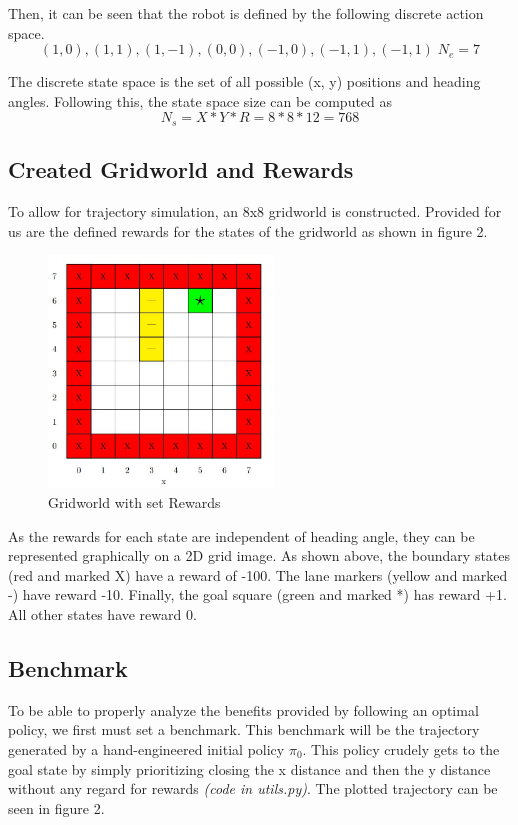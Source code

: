 \documentclass[fullpage]{article}
\begin{document}
Then, it can be seen that the robot is defined by the following discrete action space.
\[
(1, 0), (1, 1), (1,-1), (0,0), (-1,0), (-1,1), (-1,1) \; N_e = 7
\]

The discrete state space is the set of all possible (x, y) positions and heading angles. Following this, the state space size can be computed as
\[
N_s = X*Y*R = 8*8*12 = 768
\]

\subsection{Created Gridworld and Rewards}
To allow for trajectory simulation, an 8x8 gridworld is constructed. Provided for us are the defined rewards for the states of the gridworld as shown in figure 2.

\begin{figure}[t!]
\centering
\includegraphics[width=60mm]{images/gridworld.jpg}
\caption{Gridworld with set Rewards}
\label{fig:gridworld}
\end{figure}

As the rewards for each state are independent of heading angle, they can be represented graphically on a 2D grid image. As shown above, the boundary states (red and marked X) have a reward of -100. The lane markers (yellow and marked -) have reward -10. Finally, the goal square (green and marked *) has reward +1. All other states have reward 0.

\subsection{Benchmark}
To be able to properly analyze the benefits provided by following an optimal policy, we first must set a benchmark. This benchmark will be the trajectory generated by a hand-engineered initial policy $\pi_0$. This policy crudely gets to the goal state by simply prioritizing closing the x distance and then the y distance without any regard for rewards \textit{(code in utils.py)}. The plotted trajectory can be seen in figure 2.
\end{document}
